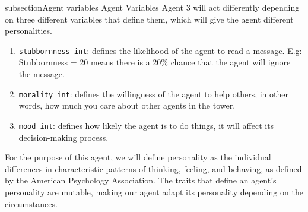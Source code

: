 subsection{Agent variables}
Agent Variables
Agent 3 will act differently depending on three different variables that define them, which will give the agent different personalities.
\begin{enumerate}
    \item \texttt{stubbornness int}: defines the likelihood of the agent to read a message. E.g: Stubbornness = 20 means there is a 20\% chance that the agent will ignore the message.
    \item \texttt{morality int}: defines  the willingness of the agent to help others, in other words, how much you care about other agents in the tower. 
    \item \texttt{mood int}: defines how likely the agent is to do things, it will affect its decision-making process.
\end{enumerate}
For the purpose of this agent, we will define personality as the individual differences in characteristic patterns of thinking, feeling, and behaving, as defined by the American Psychology Association. The traits that define an agent's personality are mutable, making our agent adapt its personality depending on the circumstances. 

